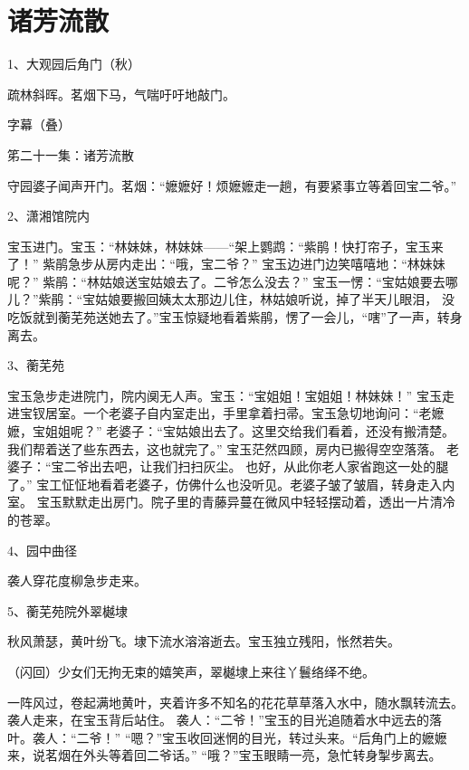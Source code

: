 \section*{诸芳流散}

1、大观园后角门（秋）\par
疏林斜晖。茗烟下马，气喘吁吁地敲门。\par
字幕（叠）\par
笫二十一集：诸芳流散\par
守园婆子闻声开门。茗烟：“嬷嬷好！烦嬷嬷走一趟，有要紧事立等着回宝二爷。”\par

2、潇湘馆院内\par
宝玉进门。宝玉：“林妹妹，林妹妹——“架上鹦鹉：“紫鹃！快打帘子，宝玉来了！”
紫鹃急步从房内走出：“哦，宝二爷？”
宝玉边进门边笑嘻嘻地：“林妹妹呢？”
紫鹃：“林姑娘送宝姑娘去了。二爷怎么没去？”
宝玉一愣：“宝姑娘要去哪儿？”紫鹃：“宝姑娘要搬回姨太太那边儿住，林姑娘听说，掉了半天儿眼泪，
没吃饭就到蘅芜苑送她去了。”宝玉惊疑地看着紫鹃，愣了一会儿，“嗐”了一声，转身离去。\par

3、蘅芜苑\par
宝玉急步走进院门，院内阒无人声。宝玉：“宝姐姐！宝姐姐！林妹妹！”
宝玉走进宝钗居室。一个老婆子自内室走出，手里拿着扫帚。宝玉急切地询问：“老嬷嬷，宝姐姐呢？”
老婆子：“宝姑娘出去了。这里交给我们看着，还没有搬清楚。
我们帮着送了些东西去，这也就完了。”
宝玉茫然四顾，房内已搬得空空落落。
老婆子：“宝二爷出去吧，让我们扫扫灰尘。
也好，从此你老人家省跑这一处的腿了。”
宝工怔怔地看着老婆子，仿佛什么也没听见。老婆子皱了皱眉，转身走入内室。
宝玉默默走出房门。院子里的青藤异蔓在微风中轻轻摆动着，透出一片清冷的苍翠。\par

4、园中曲径\par
袭人穿花度柳急步走来。\par

5、蘅芜苑院外翠樾埭\par
秋风萧瑟，黄叶纷飞。埭下流水溶溶逝去。宝玉独立残阳，怅然若失。\par
（闪回）少女们无拘无束的嬉笑声，翠樾埭上来往丫鬟络绎不绝。\par
一阵风过，卷起满地黄叶，夹着许多不知名的花花草草落入水中，随水飘转流去。袭人走来，在宝玉背后站住。
袭人：“二爷！”宝玉的目光追随着水中远去的落叶。袭人：“二爷！”
“嗯？”宝玉收回迷惘的目光，转过头来。“后角门上的嬷嬷来，说茗烟在外头等着回二爷话。”
“哦？”宝玉眼睛一亮，急忙转身掣步离去。\par

